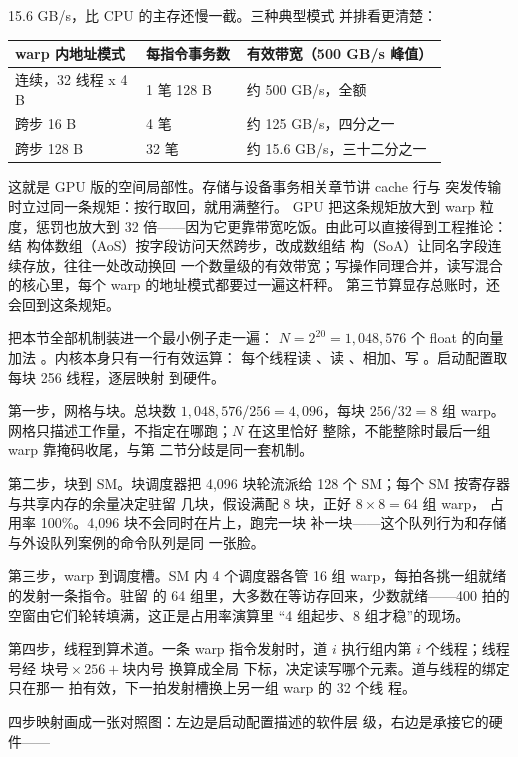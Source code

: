 15.6 GB/s，比 CPU 的主存还慢一截。三种典型模式
并排看更清楚：

\begin{longtable}{L{0.26\linewidth}L{0.2\linewidth}L{0.4\linewidth}}
\toprule
warp 内地址模式 & 每指令事务数 & 有效带宽（500 GB/s 峰值） \\
\midrule
连续，32 线程 x 4 B & 1 笔 128 B & 约 500 GB/s，全额 \\\tablerowrule
跨步 16 B & 4 笔 & 约 125 GB/s，四分之一 \\\tablerowrule
跨步 128 B & 32 笔 & 约 15.6 GB/s，三十二分之一 \\
\bottomrule
\end{longtable}

这就是 GPU 版的空间局部性。存储与设备事务相关章节讲 cache 行与
突发传输时立过同一条规矩：按行取回，就用满整行。
GPU 把这条规矩放大到 warp 粒度，惩罚也放大到 32
倍——因为它更靠带宽吃饭。由此可以直接得到工程推论：结
构体数组（AoS）按字段访问天然跨步，改成数组结
构（SoA）让同名字段连续存放，往往一处改动换回
一个数量级的有效带宽；写操作同理合并，读写混合
的核心里，每个 warp 的地址模式都要过一遍这杆秤。
第三节算显存总账时，还会回到这条规矩。

把本节全部机制装进一个最小例子走一遍：
$N=2^{20}=1,048,576$ 个 float 的向量加法
。内核本身只有一行有效运算：
每个线程读 、读 、相加、写
。启动配置取每块 256 线程，逐层映射
到硬件。

第一步，网格与块。总块数
$1,048,576/256=4,096$，每块 $256/32=8$ 组 warp。
网格只描述工作量，不指定在哪跑；$N$ 在这里恰好
整除，不能整除时最后一组 warp 靠掩码收尾，与第
二节分歧是同一套机制。

第二步，块到 SM。块调度器把 4,096 块轮流派给 128
个 SM；每个 SM 按寄存器与共享内存的余量决定驻留
几块，假设满配 8 块，正好 $8\times8=64$ 组 warp，
占用率 100\%。4,096 块不会同时在片上，跑完一块
补一块——这个队列行为和存储与外设队列案例的命令队列是同
一张脸。

第三步，warp 到调度槽。SM 内 4 个调度器各管 16
组 warp，每拍各挑一组就绪的发射一条指令。驻留
的 64 组里，大多数在等访存回来，少数就绪——400
拍的空窗由它们轮转填满，这正是占用率演算里
“4 组起步、8 组才稳”的现场。

第四步，线程到算术道。一条 warp 指令发射时，道
$i$ 执行组内第 $i$ 个线程；线程号经
$\text{块号}\times256+\text{块内号}$ 换算成全局
下标，决定读写哪个元素。道与线程的绑定只在那一
拍有效，下一拍发射槽换上另一组 warp 的 32 个线
程。

四步映射画成一张对照图：左边是启动配置描述的软件层
级，右边是承接它的硬件——

